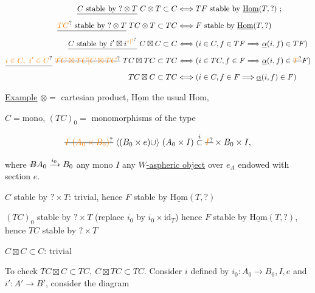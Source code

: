 \[
\begin{aligned}
\deleted{C\ \text{stable by }?\otimes T}\ C\otimes T\subset C&\Longleftrightarrow TF\ \text{stable by }\underline{\mathrm{Hom}}(T,?)\ ;\\
\deleted{\unsure{TC}\ \text{stable by }?\otimes T}\ TC\otimes T\subset TC&\Longleftrightarrow F\ \text{stable by }\underline{\mathrm{Hom}}(T,?)\\
\deleted{C\ \text{stable by }i'\boxtimes i^{\unsure{*|'}}}\ C\boxtimes C\subset C&\Longleftrightarrow(i\in C,f\in TF\Longrightarrow\underline{\alpha}(i,f)\in TF)\\
\deleted{\unsure{i\in C,\ i'\in C}}\ \deleted{\unsure{TC\boxtimes TC|C\boxtimes TC}}\ TC\boxtimes TC\subset TC&\Longleftrightarrow(i\in TC,f\in F\Longrightarrow\underline{\alpha}(i,f)\in \deleted{\unsure{T}}F)\\
TC\boxtimes C\subset TC&\Longleftrightarrow(i\in C,f\in F\Longrightarrow\underline{\alpha}(i,f)\in F)
\end{aligned}
\]


\uline{Example}  $\otimes={}$ cartesian product, $\underline{\mathrm{Hom}}$ the usual  Hom,

 $C=\mathrm{mono}$, $(TC)_0={}$ monomorphisms of the type

\[
\deleted{\unsure{I\ (A_0\times B_0)}}\ \inserted{(B_0\times e)\cup}\ (A_0\times I)\overset{i}{\subset}\deleted{\unsure{I}}\times B_0\times I,
\]

where $\deleted{B}A_0\xrightarrow{i_0}B_0$ any mono $I$ any \uline{$W$-aspheric object} over $e_A$ endowed with section $e$.


$C$ stable by $? \times T$: trivial, hence $F$ stable by $\underline{\mathrm{Hom}}(T,?)$

$(TC)_0$ stable by $?\times T$ (replace $i_0$ by $i_0\times\mathrm{id}_T$) hence $F$ stable by $\underline{\mathrm{Hom}}(T,?)$, hence $TC$ stable by $?\times T$


$C\boxtimes C\subset C$: trivial

To check $TC\boxtimes C\subset TC,\ C\boxtimes TC\subset TC$. Consider $i$ defined by $i_0\colon A_0\longrightarrow B_0,I,e$  and $i'\colon A'\longrightarrow B'$, consider the diagram

